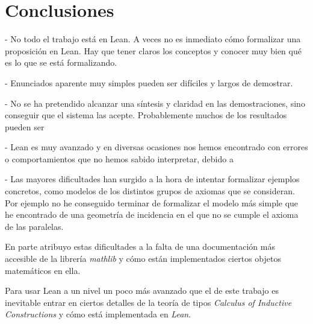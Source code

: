 \section{Conclusiones}

- No todo el trabajo está en Lean. A veces no es inmediato cómo formalizar una
proposición en Lean. Hay que tener claros los conceptos y conocer muy bien qué es lo que se
está formalizando.

- Enunciados aparente muy simples pueden ser difíciles y largos de demostrar.

- No se ha pretendido alcanzar una síntesis y claridad en las demostraciones,
sino conseguir que el sistema las acepte. Probablemente muchos de los resultados
pueden ser

- Lean es muy avanzado y en diversas ocasiones nos hemos encontrado con errores
o comportamientos que no hemos sabido interpretar, debido a

- Las mayores dificultades han surgido a la hora de intentar formalizar ejemplos
concretos, como modelos de los distintos grupos de axiomas que se consideran.
Por ejemplo no he conseguido terminar de formalizar el modelo más simple que he
encontrado de una geometría de incidencia en el que no se cumple el axioma de
las paralelas.

En parte atribuyo estas dificultades a la falta de una documentación más
accesible de la librería \textit{mathlib} y cómo están implementados ciertos
objetos matemáticos en ella.

Para usar Lean a un nivel un poco más avanzado que el de este trabajo es
inevitable entrar en ciertos detalles de la teoría de tipos \textit{Calculus of
	Inductive Constructions} y cómo está implementada en \textit{Lean}.




